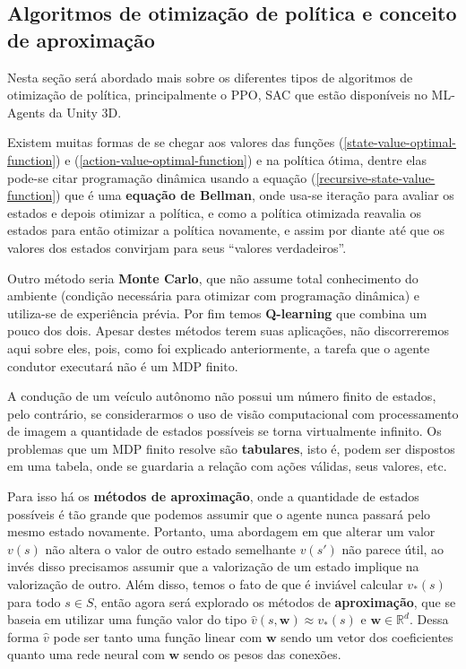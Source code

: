 \subsection{Algoritmos de otimização de política e conceito de aproximação}
Nesta seção será abordado mais sobre os diferentes tipos de algoritmos de otimização de política, principalmente o PPO, SAC que estão disponíveis no ML-Agents da Unity 3D. 

Existem muitas formas de se chegar aos valores das funções (\ref{state-value-optimal-function}) e (\ref{action-value-optimal-function}) e na política ótima, dentre elas pode-se citar programação dinâmica usando a equação (\ref{recursive-state-value-function}) que é uma \textbf{equação de Bellman}, onde usa-se iteração para avaliar os estados e depois otimizar a política, e como a política otimizada reavalia os estados para então otimizar a política novamente, e assim por diante até que os valores dos estados convirjam para seus ``valores verdadeiros''. 

Outro método seria \textbf{Monte Carlo}, que não assume total conhecimento do ambiente (condição necessária para otimizar com programação dinâmica) e utiliza-se de experiência prévia. Por fim temos \textbf{Q-learning} que combina um pouco dos dois. Apesar destes métodos terem suas aplicações, não discorreremos aqui sobre eles, pois, como foi explicado anteriormente, a tarefa que o agente condutor executará não é um MDP finito. 

A condução de um veículo autônomo não possui um número finito de estados, pelo contrário, se considerarmos o uso de visão computacional com processamento de imagem a quantidade de estados possíveis se torna virtualmente infinito. Os problemas que um MDP finito resolve são \textbf{tabulares}, isto é, podem ser dispostos em uma tabela, onde se guardaria a relação com ações válidas, seus valores, etc.

Para isso há os \textbf{métodos de aproximação}, onde a quantidade de estados possíveis é tão grande que podemos assumir que o agente nunca passará pelo mesmo estado novamente. Portanto, uma abordagem em que alterar um valor $v(s)$ não altera o valor de outro estado semelhante $v(s')$ não parece útil, ao invés disso precisamos assumir que a valorização de um estado implique na valorização de outro. Além disso, temos o fato de que é inviável calcular  $v_\ast(s)$ para todo $s \in S$, então agora será explorado os métodos de \textbf{aproximação}, que se baseia em utilizar uma função valor do tipo $\hat{v}(s, \mathbf{w}) \approx v_\ast(s)$ e $\mathbf{w} \in \mathbb{R}^d$. Dessa forma $\hat{v}$ pode ser tanto uma função linear com $\mathbf{w}$ sendo um vetor dos coeficientes quanto uma rede neural com $\mathbf{w}$ sendo os pesos das conexões.

